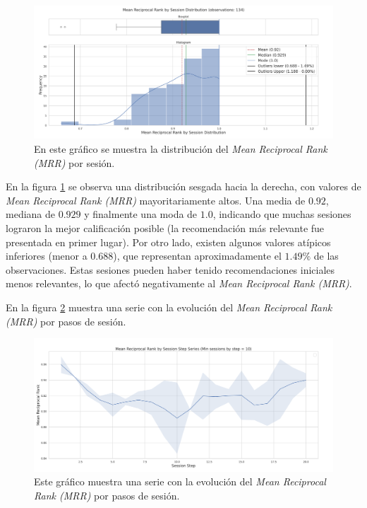 \documentclass[11pt,a4paper,twoside]{thesis}
\begin{document}
\begin{figure}[htbp]
	\centering
	\includegraphics[width=15cm]{./images/llama2/mean_reciprocal_rank_by_session_distribution.png}
	\caption{En este gráfico se muestra
		la distribución del \textit{Mean Reciprocal Rank (MRR)} por sesión.}
	\label{fig:llama2-mean_reciprocal_rank_by_session_distribution}
\end{figure}

En la figura \ref{fig:llama2-mean_reciprocal_rank_by_session_distribution} se observa una distribución sesgada hacia la derecha, con valores de \textit{Mean Reciprocal Rank (MRR)} mayoritariamente altos. Una media de $0.92$, mediana de $0.929$ y finalmente una moda de $1.0$, indicando que muchas sesiones lograron la mejor calificación posible (la recomendación más relevante fue presentada en primer lugar). Por otro lado, existen algunos valores atípicos inferiores (menor a $0.688$), que representan aproximadamente el $1.49\%$ de las observaciones. Estas sesiones pueden haber tenido recomendaciones iniciales menos relevantes, lo que afectó negativamente al \textit{Mean Reciprocal Rank (MRR)}.

\clearpage

En la figura \ref{fig:llama2-mean_reciprocal_rank_by_session_step_series} muestra una serie con la evolución del \textit{Mean Reciprocal Rank (MRR)} por pasos de sesión.

\begin{figure}[htbp]
	\centering
	\includegraphics[width=15cm]{./images/llama2/mean_reciprocal_rank_by_session_step_series.png}
	\caption{Este gráfico muestra una serie con la evolución del \textit{Mean Reciprocal Rank (MRR)} por pasos de sesión.}
	\label{fig:llama2-mean_reciprocal_rank_by_session_step_series}
\end{figure}
\end{document}
